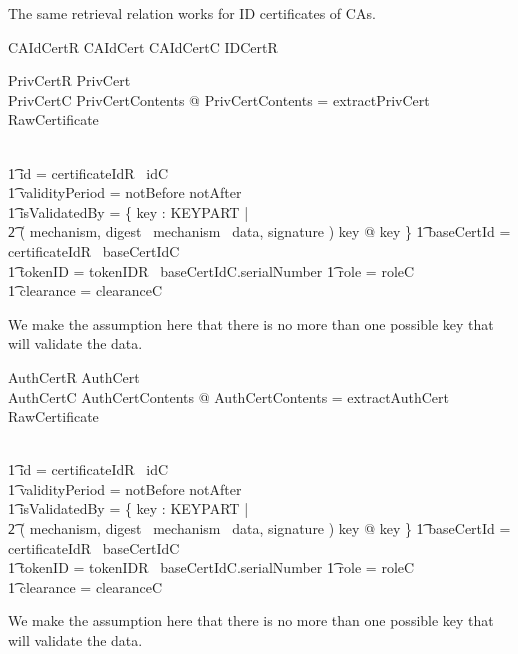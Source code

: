 The same retrieval relation works for ID certificates of CAs.
\begin{zed}
        CAIdCertR  CAIdCert \land CAIdCertC \land IDCertR
\end{zed}

\begin{schema}{PrivCertR}
        PrivCert
\\      PrivCertC
\where
        \exists PrivCertContents @
        \theta PrivCertContents = extractPrivCert~ \theta RawCertificate

\\ \t1 \land id = certificateIdR~ idC
\\ \t1  \land validityPeriod = notBefore \upto notAfter
\\ \t1  \land isValidatedBy = \{ key : KEYPART | 
\\ \t2  ( mechanism,
        digest~ mechanism~ data, signature ) \isVerifiedBy key @ key \}
\also
  \t1   \land baseCertId = certificateIdR~ baseCertIdC
\\ \t1 \land tokenID = tokenIDR~ baseCertIdC.serialNumber
\also
   \t1  \land role = roleC
\\ \t1  \land clearance = clearanceC
\end{schema}
\begin{Zcomment}
\item
We make the assumption here that there is no more than one possible key that
will validate the data. 
\end{Zcomment}

\begin{schema}{AuthCertR}
        AuthCert
\\      AuthCertC
\where
        \exists AuthCertContents @
        \theta AuthCertContents = extractAuthCert~ \theta RawCertificate

\\ \t1 \land id = certificateIdR~ idC
\\ \t1  \land validityPeriod = notBefore \upto notAfter
\\ \t1  \land isValidatedBy = \{ key : KEYPART | 
\\ \t2  ( mechanism,
        digest~ mechanism~ data, signature ) \isVerifiedBy key @ key \}
\also
   \t1 \land baseCertId = certificateIdR~ baseCertIdC
\\ \t1  \land tokenID = tokenIDR~ baseCertIdC.serialNumber
\also
   \t1  \land role = roleC
\\ \t1  \land clearance = clearanceC
\end{schema}
\begin{Zcomment}
\item
We make the assumption here that there is no more than one possible key that
will validate the data. 
\end{Zcomment}


